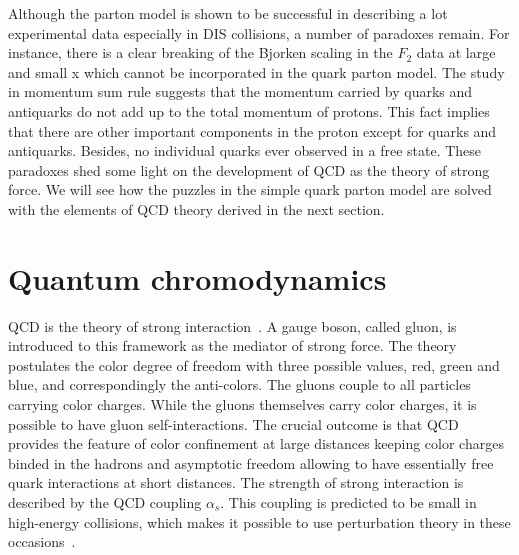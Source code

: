 Although the parton model is shown to be successful in describing a lot
experimental data especially in DIS collisions, a number of paradoxes remain.
For instance, there is a clear breaking of the Bjorken scaling in the $F_{2}$
data at large and small x which cannot be incorporated in the quark parton
model. The study in momentum sum rule suggests that the momentum carried by
quarks and antiquarks do not add up to the total momentum of protons. This fact
implies that there are other important components in the proton except for
quarks and antiquarks. Besides, no individual quarks ever observed in a free
state. These paradoxes shed some light on the development of QCD as the theory
of strong force. We will see how the puzzles in the simple quark parton model
are solved with the elements of QCD theory derived in the next section.




\section{Quantum chromodynamics} \label{sec:QCD}
QCD is the theory of strong interaction~\cite{Politzer:1974fr}. A gauge
boson, called gluon, is introduced to this framework as the mediator of strong
force. The theory postulates the color degree of freedom with three possible
values, red, green and blue, and correspondingly the anti-colors. The gluons
couple to all particles carrying color charges. While the gluons themselves
carry color charges, it is possible to have gluon self-interactions. The crucial
outcome is that QCD provides the feature of color confinement at large distances
keeping color charges binded in the hadrons and asymptotic freedom allowing to
have essentially free quark interactions at short distances. The strength of
strong interaction is described by the QCD coupling $\alpha_{s}$. This coupling
is predicted to be small in high-energy collisions, which makes it possible to
use perturbation theory in these occasions~\cite{Lipatov:1974qm}.


